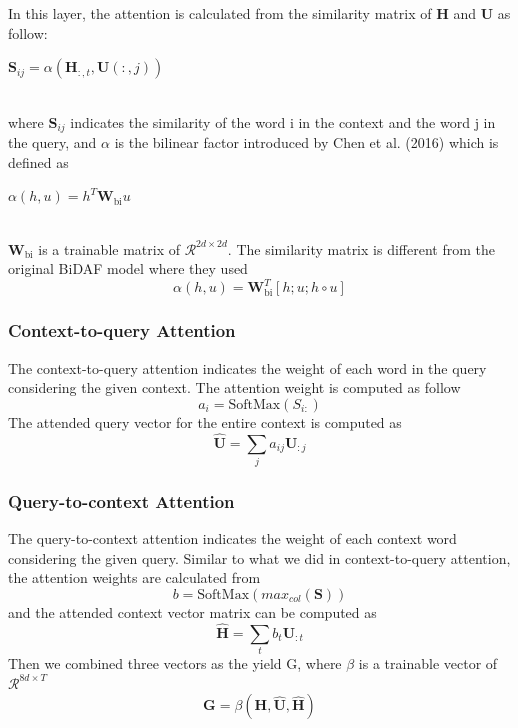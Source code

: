 \documentclass{article} %
\begin{document}
In this layer, the attention is calculated from the similarity matrix of $\textbf{H}$ and $\textbf{U}$ as follow:\\
\newline
\centerline{$\textbf{S}_{ij}=\alpha (\textbf{H}_{:,t}, \textbf{U}(:,j))$}\\
\newline
where $\textbf{S}_{ij}$ indicates the similarity of the word i in the context and the word j in the query, and $\alpha$ is the bilinear factor introduced by Chen et al. (2016) which is defined as\\
\newline
\centerline{$\alpha (h,u)=h^T\textbf{W}_{\text{bi}}u$}\\
\newline
$\textbf{W}_{\text{bi}}$ is a trainable matrix of $\mathcal{R}^{2d\times 2d}$. The similarity matrix is different from the original BiDAF model where they used 
$$\alpha (h,u)=\textbf{W}_{\text{bi}}^T[h; u; h \circ u]$$

\subsubsection{Context-to-query Attention}

The context-to-query attention indicates the weight of each word in the query considering the given context. The attention weight is computed as follow\\
$$a_i=\text{SoftMax}(S_{i:})$$
The attended query vector for the entire context is computed as
$$\hat{\textbf{U}}=\sum_j a_{ij}\textbf{U}_{:j}$$

\subsubsection{Query-to-context Attention}

The query-to-context attention indicates the weight of each context word considering the given query. Similar to what we did in context-to-query attention, the attention weights are calculated from\\
$$b=\text{SoftMax}(max_{col}(\textbf{S}))$$
and the attended context vector matrix can be computed as
$$\hat{\textbf{H}}=\sum_t b_t\textbf{U}_{:t}$$
Then we combined three vectors as the yield G, where $\beta$ is a trainable vector of $\mathcal{R}^{8d\times T}$\\
\newline
$$\textbf{G}=\beta (\textbf{H}, \hat{\textbf{U}}, \hat{\textbf{H}})$$
\end{document}
